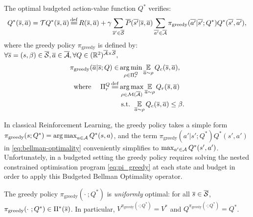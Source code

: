 \documentclass{article}
\begin{document}
\begin{theorem}
\label{thm:bellman-optimality}
The optimal budgeted action-value function $Q^*$ verifies:
\begin{equation}
\label{eq:bellman-optimality}
    Q^{*}(\os, \oa) = \cT Q^{*}(\os, \oa) \eqdef R(\os, \oa) + \gamma \sum_{\os'\in\ocS} \ov{P}(\ov{s'} | \os, \oa)\sum_{\ov{a'}\in \ocA} \pi_\text{greedy}(\ov{a'}|\ov{s'}; Q^*) Q^{*}(\ov{s'}, \ov{a'}),
\end{equation}
where the greedy policy $\pi_\text{greedy}$ is defined by: $\forall \overline{s}=(s,\beta)\in \overline{\mathcal{S}}, \overline{a}\in 
\overline{\mathcal{A}}, \forall Q\in(\mathbb{R}^2)^{\overline{\mathcal{A}}\times\overline{\mathcal{S}}},$
\begin{subequations}
\label{eq:pi_greedy}
\begin{align}
    \pi_\text{greedy}(\oa|\os; Q) \in &\argmin_{\rho\in\Pi_r^Q} \expectedvalueover{\oa\sim\rho}Q_c(\os, \oa), \label{eq:pi_greedy_cost}\\
    \text{where }\quad\Pi_r^Q \eqdef &\argmax_{\rho\in\cM(\ocA)} \expectedvalueover{\oa\sim\rho} Q_r(\os, \oa) \label{eq:pi_greedy_reward}\\
    & \text{ s.t. }  \expectedvalueover{\oa\sim\rho} Q_c(\os, \oa) \leq \beta. \label{eq:pi_greedy_constraint}
\end{align}
\end{subequations}
\end{theorem}

\begin{remark}
\label{rmk:greedy}
In classical Reinforcement Learning, the greedy policy takes a simple form $\pi_\text{greedy}(s; Q^*) = \operatorname*{arg\,max}_{a\in\mathcal{A}} Q^*(s, a)$, and the term $\pi_\text{greedy}(a'|s';Q^*) Q^{*}(s', a')$ in \eqref{eq:bellman-optimality} conveniently simplifies to $\max_{a'\in \mathcal{A}} Q^*(s', a')$. Unfortunately, in a budgeted setting the greedy policy requires solving the nested constrained optimisation program \eqref{eq:pi_greedy} at each state and budget in order to apply this Budgeted Bellman Optimality operator.
\end{remark}

\begin{proposition}
\label{prop:greedy_optimal}
The greedy policy $\pi_\text{greedy}(\cdot~; Q^*)$ is \emph{uniformly} optimal: for all $\overline{s}\in\overline{\mathcal{S}}$, $\pi_\text{greedy}(\cdot~; Q^*)\in\Pi^*(\overline{s})$. In particular, $V^{\pi_\text{greedy}(\cdot; Q^*)} = V^*$ and $Q^{\pi_\text{greedy}(\cdot; Q^*)}= Q^*$.
\end{proposition}
\end{document}
